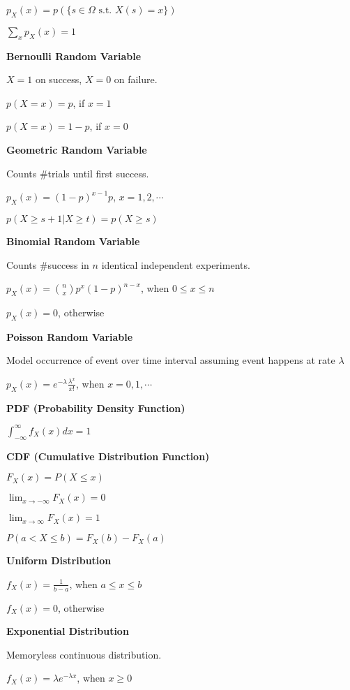 \documentclass{scrartcl}
\begin{document}
\begin{multicols*}{3}
$p_X(x)=p(\{s\in \Omega\text{ s.t. }X(s)=x\})$

$\sum_xp_X(x)=1$



{\bf Bernoulli Random Variable}

$X=1$ on success, $X=0$ on failure.

$p(X=x) = p$, if $x=1$

$p(X=x) = 1-p$, if $x=0$



{\bf Geometric Random Variable}

Counts \#trials until first success.

$p_X(x)=(1-p)^{x-1}p$, $x=1,2,\cdots$

$p(X\geq s+1|X\geq t)=p(X\geq s)$



{\bf Binomial Random Variable}

Counts \#success in $n$ identical independent experiments.

$p_X(x)={n\choose x}p^x(1-p)^{n-x}$, when $0\leq x\leq n$

$p_X(x)=0$, otherwise



{\bf Poisson Random Variable}

Model occurrence of event over time interval assuming event happens at rate $\lambda$

$p_X(x)=e^{-\lambda}\frac{\lambda^x}{x!}$, when $x=0,1,\cdots$



{\bf PDF (Probability Density Function)}

$\int_{-\infty}^\infty f_X(x)dx=1$



{\bf CDF (Cumulative Distribution Function)}

$F_X(x)=P(X\leq x)$

$\lim_{x\to -\infty}F_X(x)=0$

$\lim_{x\to\infty}F_X(x)=1$

$P(a<X\leq b)=F_X(b)-F_X(a)$



{\bf Uniform Distribution}

$f_X(x)=\frac{1}{b-a}$, when $a\leq x\leq b$

$f_X(x)=0$, otherwise



{\bf Exponential Distribution}

Memoryless continuous distribution.

$f_X(x)=\lambda e^{-\lambda x}$, when $x\geq 0$


\end{multicols*}
\end{document}
